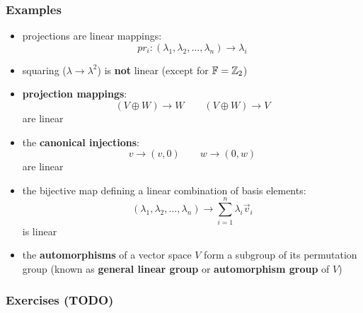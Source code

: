 \documentclass{exam}
\begin{document}
\subsubsection{Examples}

\begin{itemize}
    \item projections are linear mappings:
    \[
    pr_i : (\lambda_1, \lambda_2, \ldots, \lambda_n) \to \lambda_i
    \]
    \item squaring ($\lambda \to \lambda^2$) is \textbf{not} linear (except for $\mathbb{F} = \mathbb{Z}_2$)
    \item \textbf{projection mappings}:
    \[
    (V \oplus W) \to W \qquad (V \oplus W) \to V
    \]
    are linear
    \item the \textbf{canonical injections}:
    \[
    v \to (v,0) \qquad w \to (0,w)
    \]
    are linear
    \item the bijective map defining a linear combination of basis elements:
    \[
    (\lambda_1, \lambda_2, \ldots, \lambda_n) \to \sum_{i = 1}^n \lambda_i\vec{v}_i
    \]
    is linear
    \item the \textbf{automorphisms} of a vector space $V$ form a subgroup of its permutation group (known as \textbf{general linear group} or \textbf{automorphism group} of $V$)
\end{itemize}

\subsubsection{Exercises (TODO)}
\end{document}

